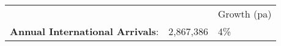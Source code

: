 \begin{tabular}[t]{p{5cm}p{1.3cm}p{1.2cm}}
   &   & Growth (pa) \\ 
 \textbf{Annual International Arrivals}: & 2,867,386 & 4\% \\ 
  \end{tabular}
